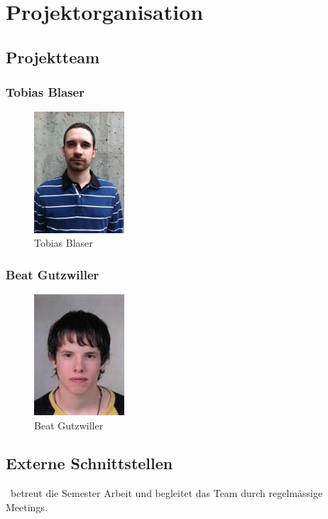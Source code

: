 \chapter{Projektorganisation}

\section{Projektteam}
\subsection*{Tobias Blaser}
\begin{figure}[H]
	\includegraphics[width=0.3\textwidth]{img/tobias.jpg}
	\centering
	\caption{Tobias Blaser}
	\label{fig:tobias}
\end{figure}

\subsection*{Beat Gutzwiller}
\begin{figure}[H]
	\includegraphics[width=0.3\textwidth]{img/beat.jpg}
	\centering
	\caption{Beat Gutzwiller}
	\label{fig:beat}
\end{figure}

\section{Externe Schnittstellen}
\teacher\ betreut die Semester Arbeit und begleitet das Team durch regelmässige Meetings.

